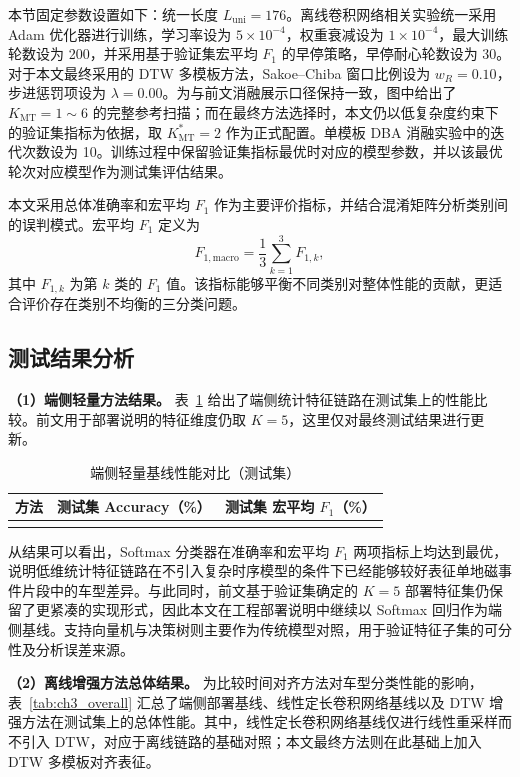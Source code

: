本节固定参数设置如下：统一长度 $L_{\mathrm{uni}}=176$。离线卷积网络相关实验统一采用 Adam 优化器进行训练，学习率设为 $5\times10^{-4}$，权重衰减设为 $1\times10^{-4}$，最大训练轮数设为 200，并采用基于验证集宏平均 $F_1$ 的早停策略，早停耐心轮数设为 30。对于本文最终采用的 DTW 多模板方法，Sakoe--Chiba 窗口比例设为 $w_R=0.10$，步进惩罚项设为 $\lambda=0.00$。为与前文消融展示口径保持一致，图中给出了 $K_{\mathrm{MT}}=1\sim 6$ 的完整参考扫描；而在最终方法选择时，本文仍以低复杂度约束下的验证集指标为依据，取 $K_{\mathrm{MT}}^\ast=2$ 作为正式配置。单模板 DBA 消融实验中的迭代次数设为 10。训练过程中保留验证集指标最优时对应的模型参数，并以该最优轮次对应模型作为测试集评估结果。

本文采用总体准确率和宏平均 $F_1$ 作为主要评价指标，并结合混淆矩阵分析类别间的误判模式。宏平均 $F_1$ 定义为
\begin{equation}
    F_{1,\mathrm{macro}}=\frac{1}{3}\sum_{k=1}^{3}F_{1,k},
\end{equation}
其中 $F_{1,k}$ 为第 $k$ 类的 $F_1$ 值。该指标能够平衡不同类别对整体性能的贡献，更适合评价存在类别不均衡的三分类问题。

\subsection{测试结果分析}
\label{subsec:ch3_exp_result}

\textbf{（1）端侧轻量方法结果。}
表~\ref{tab:ch3_edge} 给出了端侧统计特征链路在测试集上的性能比较。前文用于部署说明的特征维度仍取 $K=5$，这里仅对最终测试结果进行更新。

\begin{table}[!htbp]
\centering
\small
\caption{端侧轻量基线性能对比（测试集）}
\label{tab:ch3_edge}
\begin{tabular}{lcc}
\hline
方法 & 测试集 Accuracy（\%） & 测试集 宏平均 $F_1$（\%） \\
\hline
\\
\hline
\end{tabular}
\end{table}

从结果可以看出，Softmax 分类器在准确率和宏平均 $F_1$ 两项指标上均达到最优，说明低维统计特征链路在不引入复杂时序模型的条件下已经能够较好表征单地磁事件片段中的车型差异。与此同时，前文基于验证集确定的 $K=5$ 部署特征集仍保留了更紧凑的实现形式，因此本文在工程部署说明中继续以 Softmax 回归作为端侧基线。支持向量机与决策树则主要作为传统模型对照，用于验证特征子集的可分性及分析误差来源。

\textbf{（2）离线增强方法总体结果。}
为比较时间对齐方法对车型分类性能的影响，表~\ref{tab:ch3_overall} 汇总了端侧部署基线、线性定长卷积网络基线以及 DTW 增强方法在测试集上的总体性能。其中，线性定长卷积网络基线仅进行线性重采样而不引入 DTW，对应于离线链路的基础对照；本文最终方法则在此基础上加入 DTW 多模板对齐表征。

